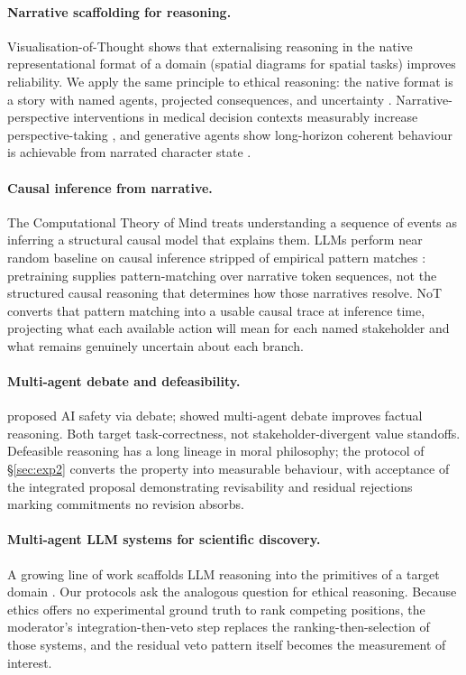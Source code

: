 \documentclass[11pt]{article}
\begin{document}
\paragraph{Narrative scaffolding for reasoning.}
Visualisation-of-Thought \citep{wu24_vot} shows that externalising
reasoning in the native representational format of a domain (spatial
diagrams for spatial tasks) improves reliability. We apply the same
principle to ethical reasoning: the native format is a story with
named agents, projected consequences, and uncertainty
\citep{macintyre81, bruner86}. Narrative-perspective interventions in
medical decision contexts measurably increase perspective-taking
\citep{shaffer19, bientzle21, bientzle24}, and generative agents show
long-horizon coherent behaviour is achievable from narrated character
state \citep{park23}.

\paragraph{Causal inference from narrative.} The Computational Theory
of Mind \citep{fodor75, putnam67} treats understanding a sequence of
events as inferring a structural causal model that explains them. LLMs
perform near random baseline on causal inference stripped of empirical
pattern matches \citep{jin23}: pretraining supplies pattern-matching
over narrative token sequences, not the structured causal reasoning
that determines how those narratives resolve. NoT converts that
pattern matching into a usable causal trace at inference time,
projecting what each available action will mean for each named
stakeholder and what remains genuinely uncertain about each branch.

\paragraph{Multi-agent debate and defeasibility.}
\citet{irving18} proposed AI safety via debate; \citet{du23} showed
multi-agent debate improves factual reasoning. Both target
task-correctness, not stakeholder-divergent value standoffs. Defeasible
reasoning \citep{pollock87, macintyre81} has a long lineage in moral
philosophy; the protocol of \S\ref{sec:exp2} converts the property into
measurable behaviour, with acceptance of the integrated proposal
demonstrating revisability and residual rejections marking commitments
no revision absorbs.

\paragraph{Multi-agent LLM systems for scientific discovery.}
A growing line of work scaffolds LLM reasoning into the primitives of
a target domain \citep{gottweis25, lu24_aiscientist, boiko23,
bran24_chemcrow, schmidgall25, swanson25_virtuallab}. Our protocols
ask the analogous question for ethical reasoning. Because ethics
offers no experimental ground truth to rank competing positions, the
moderator's integration-then-veto step replaces the
ranking-then-selection of those systems, and the residual veto pattern
itself becomes the measurement of interest.
\end{document}
